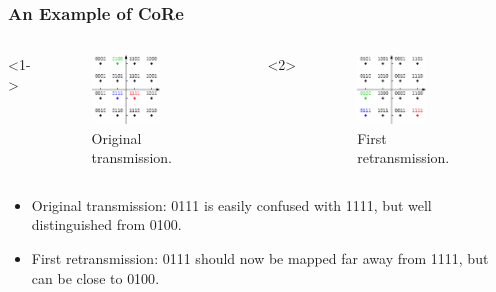 \documentclass{beamer}
\begin{document}
\begin{frame}
  \frametitle{An Example of CoRe}
  \begin{columns}[c]
    <1->
    \begin{figure}
      \includegraphics[width=0.6\textwidth]{figs/CoRe_0.pdf}
      \caption{Original transmission.}
    \end{figure}
    
    <2>
    \begin{figure}
      \includegraphics[width=0.6\textwidth]{figs/CoRe_1.pdf}
      \caption{First retransmission.}
    \end{figure}
  \end{columns}
  
  \begin{itemize}
    \item<1-> Original transmission: {\color{blue} 0111} is easily confused with
    {\color{red} 1111}, but well distinguished from {\color{green} 0100}.
    \item<2> First retransmission: {\color{blue} 0111} should now be mapped far away from {\color{red} 1111},
    but can be close to {\color{green} 0100}.
  \end{itemize}
\end{frame}
\end{document}
